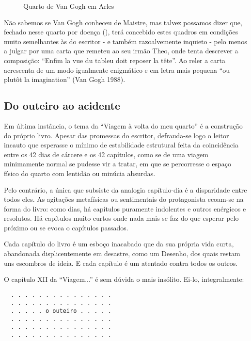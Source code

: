 \documentclass[12pt]{article}
\begin{document}
\begin{figure}
  \label{fig:1}
  \caption{Quarto de Van Gogh em Arles}
\end{figure}

Não sabemos se Van Gogh conheceu de Maistre, mas talvez possamos dizer que, fechado nesse quarto por doença (\cite{goghroom}), terá concebido estes quadros em condições muito semelhantes às do escritor - e também razoalvemente inquieto - pelo menos a julgar por uma carta que remeteu ao seu irmão Theo, onde tenta descrever a composição: ``Enfim la vue du tableu doit reposer la tête''. Ao reler a carta acrescenta de um modo igualmente enigmático e em letra mais pequena ``ou plutôt la imagination'' (Van Gogh 1988). 

\subsection{Do outeiro ao acidente}

Em última instância, o tema da ``Viagem à volta do meu quarto'' é a construção do próprio livro. Apesar das promessas do escritor, defrauda-se logo o leitor incauto que esperasse o mínimo de estabilidade estrutural feita da coincidência entre os 42 dias de cárcere e os 42 capítulos, como se de uma viagem minimamente normal se pudesse vir a tratar, em que se percorresse o espaço físico do quarto com lentidão ou minúcia absurdas.

Pelo contrário, a única que subsiste da analogia capítulo-dia é a disparidade entre todos eles. As agitações metafísicas ou sentimentais do protagonista ecoam-se na forma do livro: como dias, há capítulos puramente indolentes e outros enérgicos e resolutos. Há capítulos muito curtos onde nada mais se faz do que esperar pelo próximo ou se evoca o capítulos passados. 

Cada capítulo do livro é um esboço inacabado que da sua própria vida curta, abandonada displicentemente em desastre, como um Desenho, dos quais restam uns escombros de ideia. E cada capítulo é um atentado contra todos os outros.

O capítulo XII da ``Viagem...'' é sem dúvida o mais insólito. Ei-lo, integralmente:

\begin{verbatim}
  . . . . . . . . . . . . . . .
  . . . . . . . . . . . . . . .
  . . . . . o outeiro . . . . .
  . . . . . . . . . . . . . . .
  . . . . . . . . . . . . . . .
  . . . . . . . . . . . . . . .
\end{verbatim}
\end{document}
